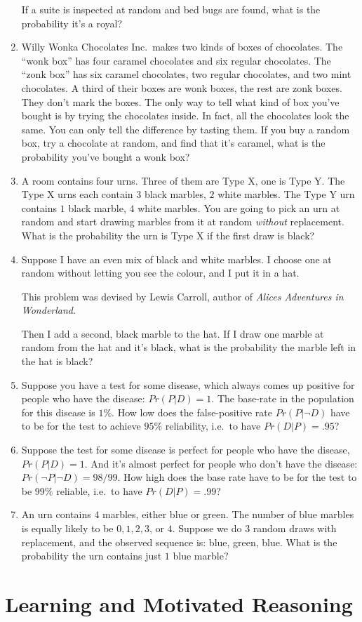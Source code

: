 \documentclass[]{tufte-book}
\begin{document}
\begin{enumerate}
  If a suite is inspected at random and bed bugs are found, what is the probability it's a royal?
\item
  Willy Wonka Chocolates Inc.~makes two kinds of boxes of chocolates. The ``wonk box'' has four caramel chocolates and six regular chocolates. The ``zonk box'' has six caramel chocolates, two regular chocolates, and two mint chocolates. A third of their boxes are wonk boxes, the rest are zonk boxes. They don't mark the boxes. The only way to tell what kind of box you've bought is by trying the chocolates inside. In fact, all the chocolates look the same. You can only tell the difference by tasting them. If you buy a random box, try a chocolate at random, and find that it's caramel, what is the probability you've bought a wonk box?
\item
  A room contains four urns. Three of them are Type X, one is Type Y. The Type X urns each contain \(3\) black marbles, \(2\) white marbles. The Type Y urn contains \(1\) black marble, \(4\) white marbles. You are going to pick an urn at random and start drawing marbles from it at random \emph{without} replacement. What is the probability the urn is Type X if the first draw is black?
\item
  Suppose I have an even mix of black and white marbles. I choose one at random without letting you see the colour, and I put it in a hat.

  \begin{marginfigure}
  This problem was devised by Lewis Carroll, author of \emph{Alices
  Adventures in Wonderland}.
  \end{marginfigure}

  Then I add a second, black marble to the hat. If I draw one marble at random from the hat and it's black, what is the probability the marble left in the hat is black?
\item
  Suppose you have a test for some disease, which always comes up positive for people who have the disease: \(Pr(P | D) = 1\). The base-rate in the population for this disease is \(1\%\). How low does the false-positive rate \(Pr(P | \neg D)\) have to be for the test to achieve \(95\%\) reliability, i.e.~to have \(Pr(D | P) = .95\)?
\item
  Suppose the test for some disease is perfect for people who have the disease, \(Pr(P | D) = 1\). And it's almost perfect for people who don't have the disease: \(Pr(\neg P | \neg D) = 98/99\). How high does the base rate have to be for the test to be \(99\%\) reliable, i.e.~to have \(Pr(D | P) = .99\)?
\item
  An urn contains \(4\) marbles, either blue or green. The number of blue marbles is equally likely to be \(0, 1, 2, 3\), or \(4\). Suppose we do \(3\) random draws with replacement, and the observed sequence is: blue, green, blue. What is the probability the urn contains just \(1\) blue marble?
\end{enumerate}

\hypertarget{learning-and-motivated-reasoning}{%
\chapter{Learning and Motivated Reasoning}\label{learning-and-motivated-reasoning}}
\end{document}
